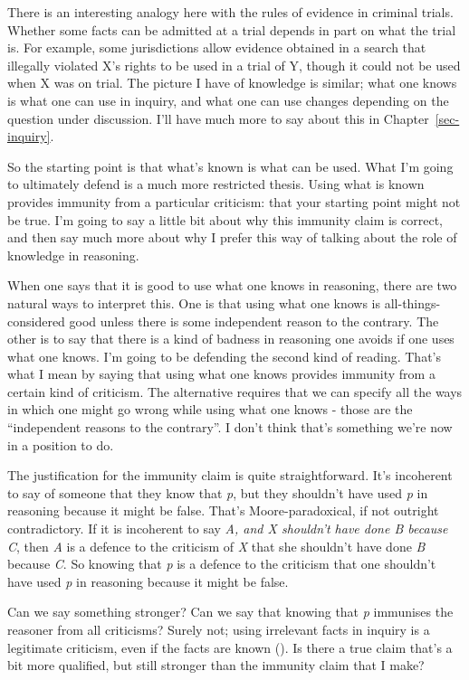 \documentclass[
  10pt,
  letterpaper,
  twoside]{scrbook}
\begin{document}
There is an interesting analogy here with the rules of evidence in
criminal trials. Whether some facts can be admitted at a trial depends
in part on what the trial is. For example, some jurisdictions allow
evidence obtained in a search that illegally violated X's rights to be
used in a trial of Y, though it could not be used when X was on trial.
The picture I have of knowledge is similar; what one knows is what one
can use in inquiry, and what one can use changes depending on the
question under discussion. I'll have much more to say about this in
Chapter~\ref{sec-inquiry}.

So the starting point is that what's known is what can be used. What I'm
going to ultimately defend is a much more restricted thesis. Using what
is known provides immunity from a particular criticism: that your
starting point might not be true. I'm going to say a little bit about
why this immunity claim is correct, and then say much more about why I
prefer this way of talking about the role of knowledge in reasoning.

When one says that it is good to use what one knows in reasoning, there
are two natural ways to interpret this. One is that using what one knows
is all-things-considered good unless there is some independent reason to
the contrary. The other is to say that there is a kind of badness in
reasoning one avoids if one uses what one knows. I'm going to be
defending the second kind of reading. That's what I mean by saying that
using what one knows provides immunity from a certain kind of criticism.
The alternative requires that we can specify all the ways in which one
might go wrong while using what one knows - those are the ``independent
reasons to the contrary''. I don't think that's something we're now in a
position to do.

The justification for the immunity claim is quite straightforward. It's
incoherent to say of someone that they know that \emph{p}, but they
shouldn't have used \emph{p} in reasoning because it might be false.
That's Moore-paradoxical, if not outright contradictory. If it is
incoherent to say \emph{A, and X shouldn't have done B because C}, then
\emph{A} is a defence to the criticism of \emph{X} that she shouldn't
have done \emph{B} because \emph{C}. So knowing that \emph{p} is a
defence to the criticism that one shouldn't have used \emph{p} in
reasoning because it might be false.

Can we say something stronger? Can we say that knowing that \emph{p}
immunises the reasoner from all criticisms? Surely not; using irrelevant
facts in inquiry is a legitimate criticism, even if the facts are known
(). Is there a true claim
that's a bit more qualified, but still stronger than the immunity claim
that I make?
\end{document}
